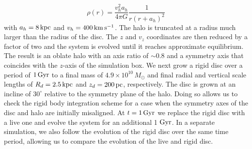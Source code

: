 \begin{equation}
\rho(r) = \frac{v_h^2 a_h}{4\pi G} \frac{1}{r\left (r + a_h\right )^2}
\end{equation}
with $a_h = 8\,{\rm kpc}$ and $v_h = 400\,{\rm km\,s^{-1}}$.  The halo
is truncated at a radius much larger than the radius of the disc.  The
$z$ and $v_z$ coordinates are then reduced by a factor of two and the
system is evolved until it reaches approximate equilibrium.  The
result is an oblate halo with an axis ratio of $\sim 0.8$ and a
symmetry axis that coincides with the $z$-axis of the simulation box.
We next grow a rigid disc over a period of $1\,{\rm Gyr}$ to a final
mass of $4.9 \times 10^{10}\,M_\odot$ and final radial and vertical
scale lengths of $R_d =2.5\,{\rm kpc}$ and $z_d = 200\,{\rm pc}$,
respectively.  The disc is grown at an incline of $30^\circ$ relative
to the symmetry plane of the halo.  Doing so allows us to check the
rigid body integration scheme for a case when the symmetry axes of the
disc and halo are initially misaligned.  At $t=1\,{\rm Gyr}$ we
replace the rigid disc with a live one and evolve the system for an
additional 1 ${\rm Gyr}$.  In a separate simulation, we also follow
the evolution of the rigid disc over the same time period, allowing us
to compare the evolution of the live and rigid disc.

